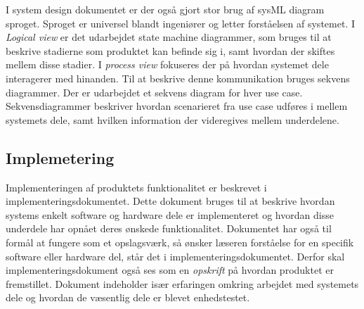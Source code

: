 	I system design dokumentet er der også gjort stor brug af sysML diagram sproget. Sproget er universel blandt ingeniører og letter forståelsen af systemet. I \textit{Logical view} er det udarbejdet state machine diagrammer, som bruges til at beskrive stadierne som produktet kan befinde sig i, samt hvordan der skiftes mellem disse stadier. I \textit{process view} fokuseres der på hvordan systemet dele interagerer med hinanden. Til at beskrive denne kommunikation bruges sekvens diagrammer. Der er udarbejdet et sekvens diagram for hver use case. Sekvensdiagrammer beskriver hvordan scenarieret fra use case udføres i mellem systemets dele, samt hvilken information der videregives mellem underdelene. 
	
	\subsection{Implemetering} \label{title:implementering}
	Implementeringen af produktets funktionalitet er beskrevet i implementeringsdokumentet. Dette dokument bruges til at beskrive hvordan systems enkelt software og hardware dele er implementeret og hvordan disse underdele har opnået deres ønskede funktionalitet. Dokumentet har også til formål at fungere som et opslagsværk, så ønsker læseren forståelse for en specifik software eller hardware del, står det i implementeringsdokumentet. Derfor skal implementeringsdokument også ses som en \textit{opskrift} på hvordan produktet er fremstillet. Dokument indeholder især erfaringen omkring arbejdet med systemets dele og hvordan de væsentlig dele er blevet enhedstestet. 

